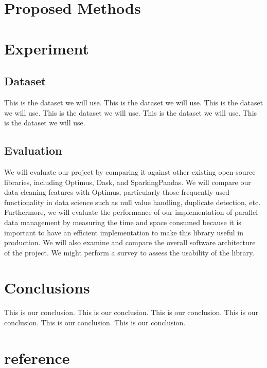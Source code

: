 \documentclass[sigconf]{acmart}
\begin{document}
\section{Proposed Methods}

\section{Experiment}
\subsection{Dataset}
This is the dataset we will use.
This is the dataset we will use.
This is the dataset we will use.
This is the dataset we will use.
This is the dataset we will use.
This is the dataset we will use.

\subsection{Evaluation}
We will evaluate our project by comparing it against other existing open-source libraries, including Optimus\cite{optimus}, Dask\cite{dask}, and SparkingPandas\cite{sparklingpandas}. We will compare our data cleaning features with Optimus, particularly those frequently used functionality in data science such as null value handling, duplicate detection, etc. Furthermore, we will evaluate the performance of our implementation of parallel data management by measuring the time and space consumed because it is important to have an efficient implementation to make this library useful in production. We will also examine and compare the overall software architecture of the project. We might perform a survey to assess the usability of the library.


\section{Conclusions}
This is our conclusion.
This is our conclusion.
This is our conclusion.
This is our conclusion.
This is our conclusion.
This is our conclusion.


\section{reference}


\end{document}

